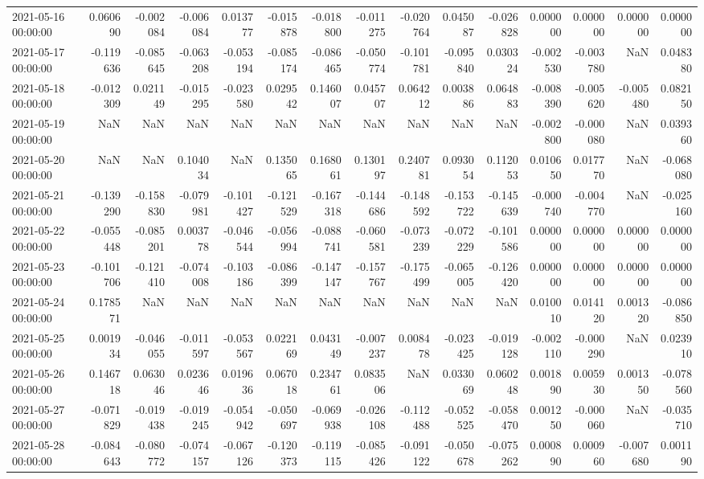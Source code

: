 \begin{tabular}{lrrrrrrrrrrrrrr}
2021-05-16 00:00:00 & 0.060690 & -0.002084 & -0.006084 & 0.013777 & -0.015878 & -0.018800 & -0.011275 & -0.020764 & 0.045087 & -0.026828 & 0.000000 & 0.000000 & 0.000000 & 0.000000 \\
2021-05-17 00:00:00 & -0.119636 & -0.085645 & -0.063208 & -0.053194 & -0.085174 & -0.086465 & -0.050774 & -0.101781 & -0.095840 & 0.030324 & -0.002530 & -0.003780 & NaN & 0.048380 \\
2021-05-18 00:00:00 & -0.012309 & 0.021149 & -0.015295 & -0.023580 & 0.029542 & 0.146007 & 0.045707 & 0.064212 & 0.003886 & 0.064883 & -0.008390 & -0.005620 & -0.005480 & 0.082150 \\
2021-05-19 00:00:00 & NaN & NaN & NaN & NaN & NaN & NaN & NaN & NaN & NaN & NaN & -0.002800 & -0.000080 & NaN & 0.039360 \\
2021-05-20 00:00:00 & NaN & NaN & 0.104034 & NaN & 0.135065 & 0.168061 & 0.130197 & 0.240781 & 0.093054 & 0.112053 & 0.010650 & 0.017770 & NaN & -0.068080 \\
2021-05-21 00:00:00 & -0.139290 & -0.158830 & -0.079981 & -0.101427 & -0.121529 & -0.167318 & -0.144686 & -0.148592 & -0.153722 & -0.145639 & -0.000740 & -0.004770 & NaN & -0.025160 \\
2021-05-22 00:00:00 & -0.055448 & -0.085201 & 0.003778 & -0.046544 & -0.056994 & -0.088741 & -0.060581 & -0.073239 & -0.072229 & -0.101586 & 0.000000 & 0.000000 & 0.000000 & 0.000000 \\
2021-05-23 00:00:00 & -0.101706 & -0.121410 & -0.074008 & -0.103186 & -0.086399 & -0.147147 & -0.157767 & -0.175499 & -0.065005 & -0.126420 & 0.000000 & 0.000000 & 0.000000 & 0.000000 \\
2021-05-24 00:00:00 & 0.178571 & NaN & NaN & NaN & NaN & NaN & NaN & NaN & NaN & NaN & 0.010010 & 0.014120 & 0.001320 & -0.086850 \\
2021-05-25 00:00:00 & 0.001934 & -0.046055 & -0.011597 & -0.053567 & 0.022169 & 0.043149 & -0.007237 & 0.008478 & -0.023425 & -0.019128 & -0.002110 & -0.000290 & NaN & 0.023910 \\
2021-05-26 00:00:00 & 0.146718 & 0.063046 & 0.023646 & 0.019636 & 0.067018 & 0.234761 & 0.083506 & NaN & 0.033069 & 0.060248 & 0.001890 & 0.005930 & 0.001350 & -0.078560 \\
2021-05-27 00:00:00 & -0.071829 & -0.019438 & -0.019245 & -0.054942 & -0.050697 & -0.069938 & -0.026108 & -0.112488 & -0.052525 & -0.058470 & 0.001250 & -0.000060 & NaN & -0.035710 \\
2021-05-28 00:00:00 & -0.084643 & -0.080772 & -0.074157 & -0.067126 & -0.120373 & -0.119115 & -0.085426 & -0.091122 & -0.050678 & -0.075262 & 0.000890 & 0.000960 & -0.007680 & 0.001190 \\

\end{tabular}
